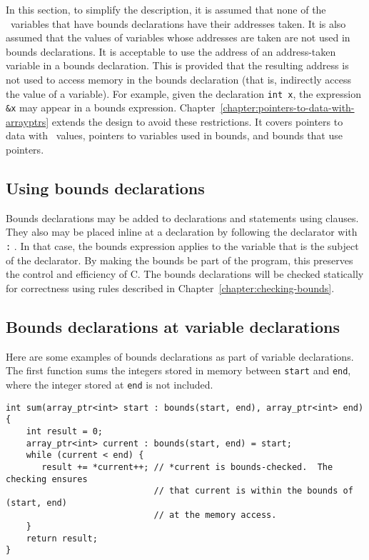 In this section, to simplify the description, it is assumed that none of
the \arrayptr\ variables that have bounds declarations have
their addresses taken. It is also assumed that the values of variables
whose addresses are taken are not used in bounds declarations. It is
acceptable to use the address of an address-taken variable in a bounds
declaration. This is provided that the resulting address is not used to
access memory in the bounds declaration (that is, indirectly access the
value of a variable). For example, given the declaration \texttt{int x},
the expression \texttt{\&x} may appear in a bounds expression.  
Chapter~\ref{chapter:pointers-to-data-with-arrayptrs} extends the
design to avoid these restrictions.  It covers pointers to data with 
\arrayptr\ values,  pointers to variables used in bounds, and bounds 
that use pointers.

\subsection{Using bounds declarations}

Bounds declarations may be added to declarations and statements using
 clauses. They also may be placed inline at a declaration
by following the declarator with \texttt{:} . In that
case, the bounds expression applies to the variable that is the subject
of the declarator. By making the bounds be part of the program, this
preserves the control and efficiency of C. The bounds declarations will
be checked statically for correctness using rules described in 
Chapter~\ref{chapter:checking-bounds}.

\subsection{Bounds declarations at variable declarations}
\label{section:variable-declarations}

Here are some examples of bounds declarations as part of variable
declarations. The first function sums the integers stored in memory
between \texttt{start} and \texttt{end}, where the integer stored at
\texttt{end} is not included.

\begin{verbatim}
int sum(array_ptr<int> start : bounds(start, end), array_ptr<int> end)
{ 
    int result = 0;
    array_ptr<int> current : bounds(start, end) = start;
    while (current < end) {
       result += *current++; // *current is bounds-checked.  The checking ensures 
                             // that current is within the bounds of (start, end) 
                             // at the memory access.                           
    }
    return result;
}
\end{verbatim}

